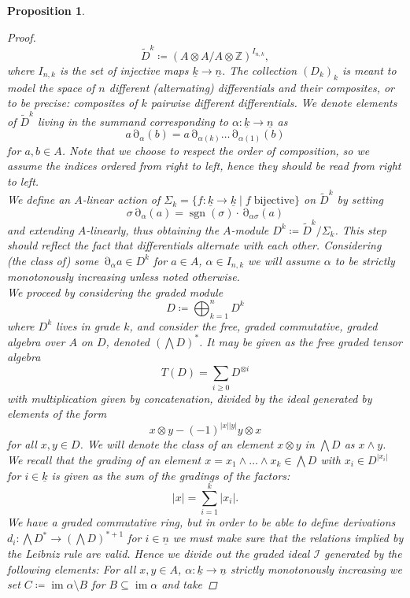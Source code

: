 \documentclass[10pt, a4paper, UKenglish]{article}
\numberwithin{equation}{section}
\newcommand{\bZ}{\mathbb{Z}}
\newcommand{\abs}[1]{\left\vert#1\right\vert}	%
\newcommand{\with}{\mid}  %
\newcommand{\ind}[1]{\underline{#1}}
\renewcommand{\k}{\ind{k}}
\newcommand{\n}{\ind{n}}
\newcommand{\sgn}{\operatorname{sgn}}
\newcommand{\im}{\operatorname{im}}
\theoremstyle{plain}
\newtheorem{prop}[equation]{Proposition}
\theoremstyle{definition}
\renewcommand{\to}{\longrightarrow}
\newcommand{\del}{\operatorname{\partial}}
\begin{document}
\begin{prop}
\begin{proof}
$$\tilde{D}^k \coloneqq (A \otimes A / A \otimes \bZ) ^ { I_{n,k} },$$
where $I_{n,k}$ is the set of injective maps $\ind{k} \to \ind{n}$. The collection $(D_k)_k$ is meant to model the space of $n$ different (alternating) differentials and their composites, or to be precise: composites of $k$ pairwise different differentials. We denote elements of $\tilde{D}^k$ living in the summand corresponding to $\alpha: \k \to \n$ as
\[a \del_\alpha (b) = a \del_{\alpha(k)} \ldots \del_{\alpha(1)} (b)\]%
for $a,b \in A$. Note that we choose to respect the order of composition, so we assume the indices ordered from right to left, hence they should be read from right to left.\\%
We define an $A$-linear action of $\Sigma_k = \{f: \ind{k} \to \ind{k} \with f \; \mathrm{bijective} \}$ on $\tilde{D}^k$ by setting%
$$\sigma \del_\alpha (a) = \sgn(\sigma) \cdot \del_{\alpha \sigma} (a)$$
and extending $A$-linearly, thus obtaining the $A$-module $D^k \coloneqq \tilde{D}^k/\Sigma_k$. This step should reflect the fact that differentials alternate with each other. Considering (the class of) some $\del_\alpha a \in D^k$ for $a \in A$, $\alpha \in I_{n,k}$ we will assume $\alpha$ to be strictly monotonously increasing unless noted otherwise.\\
We proceed by considering the graded module
\begin{equation*}
D \coloneqq \bigoplus_{k=1}^{n} D^k
\end{equation*}
where $D^k$ lives in grade $k$, and consider the free, graded commutative, graded algebra over $A$ on $D$, denoted $(\bigwedge D)^*$. It may be given as the free graded tensor algebra
\begin{equation*}
	T (D) = \sum_{i \geq 0} D^{\otimes i}
\end{equation*}
with multiplication given by concatenation, divided by the ideal generated by elements of the form
\begin{equation*}
	x \otimes y - (-1)^{\abs{x}\abs{y}} y \otimes x
\end{equation*}
for all $x,y \in D$. We will denote the class of an element $x \otimes y$ in $\bigwedge D$ as $x \wedge y$. We recall that the grading of an element $x = x_1 \wedge \ldots \wedge x_k \in \bigwedge D$ with $x_i \in D^{\abs{x_i}}$ for $i \in \ind{k}$ is given as the sum of the gradings of the factors:
\begin{equation*}
	\abs{x} = \sum_{i=1}^k \abs{x_i}.
\end{equation*}
We have a graded commutative ring, but in order to be able to define derivations $d_i: \bigwedge D ^* \to (\bigwedge D)^{*+1}$ for $i \in \ind{n}$ we must make sure that the relations implied by the Leibniz rule are valid. Hence we divide out the graded ideal $\mathcal{I}$ generated by the following elements: For all $x,y \in A$, $\alpha: \k \to \n$ strictly monotonously increasing we set $C \coloneqq \im \alpha \setminus B$ for $B \subseteq \im \alpha$ and take

\end{proof}
\end{prop}
\end{document}
